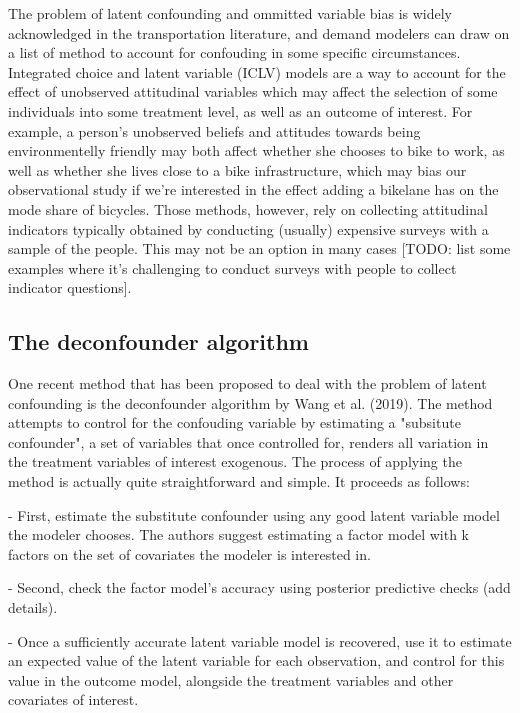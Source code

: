 The problem of latent confounding and ommitted variable bias is widely 
acknowledged in the transportation literature, and demand modelers can draw on 
a list of method to account for confouding in some specific circumstances. 
Integrated choice and latent variable (ICLV) models are a way to account for 
the effect of unobserved attitudinal variables which may affect the selection 
of some individuals into some treatment level, as well as an outcome of 
interest. For example, a person's unobserved beliefs and attitudes towards 
being environmentelly friendly may both affect whether she chooses to bike to 
work, as well as whether she lives close to a bike infrastructure, which may 
bias our observational study if we're interested in the effect adding a 
bikelane has on the mode share of bicycles. Those methods, however, rely on 
collecting attitudinal indicators typically obtained by conducting (usually) 
expensive surveys with a sample of the people. This may not be an option in 
many cases [TODO: list some examples where it's challenging to conduct surveys 
with people to collect indicator questions]. 


\subsection{The deconfounder algorithm}



One recent method that has been proposed to deal with the problem of latent 
confounding is the deconfounder algorithm by Wang et al. (2019). The method 
attempts to control for the confouding variable by estimating a "subsitute 
confounder", a set of variables that once controlled for, renders all 
variation in the treatment variables of interest exogenous. The process of 
applying the method is actually quite straightforward and simple. It proceeds 
as follows:


	- First, estimate the substitute confounder using any good latent variable 
	model the modeler chooses. The authors suggest estimating a factor model 
	with k factors on the set of covariates the modeler is interested in. 

	- Second, check the factor model's accuracy using posterior predictive 
	checks (add details). 

	- Once a sufficiently accurate latent variable model is recovered, use it 
	to estimate an expected value of the latent variable for each observation, 
	and control for this value in the outcome model, alongside the treatment 
	variables and other covariates of interest. 




